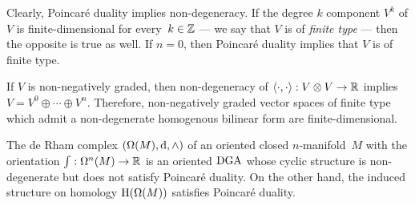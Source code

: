 \documentclass[\MainFolder/Text.tex]{subfiles}
\begin{document}
\begin{Remark}\label{Rem:NonDegPD}
\begin{RemarkList}
\item Clearly, Poincar\'e duality implies non-degeneracy. If the degree $k$ component $V^k$ of $V$ is finite-dimensional for every~$k\in \mathbb{Z}$ --- we say that $V$ is of \emph{finite type} --- then the opposite is true as well. If $n=0$, then Poincar\'e duality implies that $V$ is of finite type.
\item If $V$ is non-negatively graded, then non-degeneracy of $\langle\cdot,\cdot\rangle: V\otimes V \rightarrow \mathbb{R}$ implies $V = V^0 \oplus \dotsb \oplus V^n$. Therefore, non-negatively graded vector spaces of finite type which admit a non-degenerate homogenous bilinear form are finite-dimensional.
\item The de Rham complex $(\Omega(M),\mathrm{d},\wedge)$ of an oriented closed $n$-manifold~$M$ with the orientation $\int: \Omega^n(M) \rightarrow \mathbb{R}$ is an oriented $\mathrm{DGA}$ whose cyclic structure is non-degenerate but does not satisfy Poincar\'e duality. On the other hand, the induced structure on homology $\mathrm{H}(\Omega(M))$ satisfies Poincar\'e duality.
\qedhere
\end{RemarkList}
\end{Remark}
%
\end{document}

